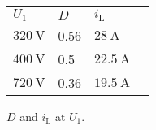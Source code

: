 \begin{solutiontable}[htb]
    \centering  %
    \begin{tabular}{llll}
        \toprule
        
        $U_\mathrm{1}$ & $D$ & $i_\mathrm{L}$ \\ 
        $\SI{320}{\volt}$ & 0.56 & $\SI{28}{\ampere}$ \\ 
        $\SI{400}{\volt}$ & 0.5 & $\SI{22.5}{\ampere}$ \\ 
        $\SI{720}{\volt}$ & 0.36 & $\SI{19.5}{\ampere}$ \\ 
        \bottomrule
    \end{tabular}
    \caption{$D$ and $i_\mathrm{L}$ at $U_\mathrm{1}$.} 
\end{solutiontable}
